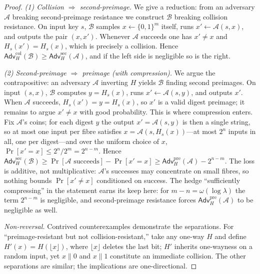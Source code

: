 \documentclass[11pt,a4paper]{article}
\theoremstyle{definition}
\theoremstyle{remark}
\begin{document}
\begin{proof}
\emph{(1) Collision \(\Rightarrow\) second-preimage.} We give a reduction: from an adversary \(\mathcal{A}\) breaking second-preimage resistance we construct \(\mathcal{B}\) breaking collision resistance. On input key \(s\), \(\mathcal{B}\) samples \(x \leftarrow \{0,1\}^{m}\) itself, runs \(x' \leftarrow \mathcal{A}(s,x)\), and outputs the pair \((x,x')\). Whenever \(\mathcal{A}\) succeeds one has \(x' \neq x\) and \(H_{s}(x') = H_{s}(x)\), which is precisely a collision. Hence \(\mathsf{Adv}^{\mathrm{col}}_{H}(\mathcal{B}) \geq \mathsf{Adv}^{\mathrm{sec}}_{H}(\mathcal{A})\), and if the left side is negligible so is the right.

\emph{(2) Second-preimage \(\Rightarrow\) preimage (with compression).} We argue the contrapositive: an adversary \(\mathcal{A}\) inverting \(H\) yields \(\mathcal{B}\) finding second preimages. On input \((s,x)\), \(\mathcal{B}\) computes \(y = H_{s}(x)\), runs \(x' \leftarrow \mathcal{A}(s,y)\), and outputs \(x'\). When \(\mathcal{A}\) succeeds, \(H_{s}(x') = y = H_{s}(x)\), so \(x'\) is a valid digest preimage; it remains to argue \(x' \neq x\) with good probability. This is where compression enters. Fix \(\mathcal{A}\)'s coins; for each digest \(y\) the output \(x' = \mathcal{A}(s,y)\) is then a single string, so at most one input per fibre satisfies \(x = \mathcal{A}(s, H_{s}(x))\)---at most \(2^{n}\) inputs in all, one per digest---and over the uniform choice of \(x\), \(\Pr[x' = x] \leq 2^{n}/2^{m} = 2^{n-m}\). Hence \(\mathsf{Adv}^{\mathrm{sec}}_{H}(\mathcal{B}) \geq \Pr[\mathcal{A}\text{ succeeds}] - \Pr[x' = x] \geq \mathsf{Adv}^{\mathrm{pre}}_{H}(\mathcal{A}) - 2^{n-m}\). The loss is additive, not multiplicative: \(\mathcal{A}\)'s successes may concentrate on small fibres, so nothing bounds \(\Pr[x' \neq x]\) conditioned on success. The hedge ``sufficiently compressing'' in the statement earns its keep here: for \(m - n = \omega(\log \lambda)\) the term \(2^{n-m}\) is negligible, and second-preimage resistance forces \(\mathsf{Adv}^{\mathrm{pre}}_{H}(\mathcal{A})\) to be negligible as well.

\emph{Non-reversal.} Contrived counterexamples demonstrate the separations. For ``preimage-resistant but not collision-resistant,'' take any one-way \(H\) and define \(H'(x) = H(\lfloor x \rfloor)\), where \(\lfloor x \rfloor\) deletes the last bit; \(H'\) inherits one-wayness on a random input, yet \(x \mathbin{\|} 0\) and \(x \mathbin{\|} 1\) constitute an immediate collision. The other separations are similar; the implications are one-directional.
\end{proof}
\end{document}
